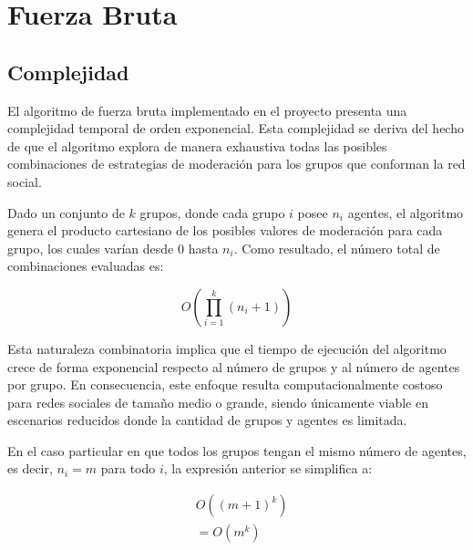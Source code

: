 




\maketitle

\tableofcontents

\newpage

\section{Fuerza Bruta}

\subsection{Complejidad}

El algoritmo de fuerza bruta implementado en el proyecto presenta una complejidad temporal de orden exponencial. Esta complejidad se deriva del hecho de que el algoritmo explora de manera exhaustiva todas las posibles combinaciones de estrategias de moderación para los grupos que conforman la red social.

Dado un conjunto de $k$ grupos, donde cada grupo $i$ posee $n_i$ agentes, el algoritmo genera el producto cartesiano de los posibles valores de moderación para cada grupo, los cuales varían desde $0$ hasta $n_i$. Como resultado, el número total de combinaciones evaluadas es:

\begin{equation}
	O \left(\prod_{ i = 1 }^k (n_i + 1) \right )
\end{equation}

Esta naturaleza combinatoria implica que el tiempo de ejecución del algoritmo crece de forma exponencial respecto al número de grupos y al número de agentes por grupo. En consecuencia, este enfoque resulta computacionalmente costoso para redes sociales de tamaño medio o grande, siendo únicamente viable en escenarios reducidos donde la cantidad de grupos y agentes es limitada.

En el caso particular en que todos los grupos tengan el mismo número de agentes, es decir, $n_i = m$ para todo $i$, la expresión anterior se simplifica a:

\begin{align}
	& O \left((m + 1)^k \right ) \\
	& = O(m^k)
\end{align}

